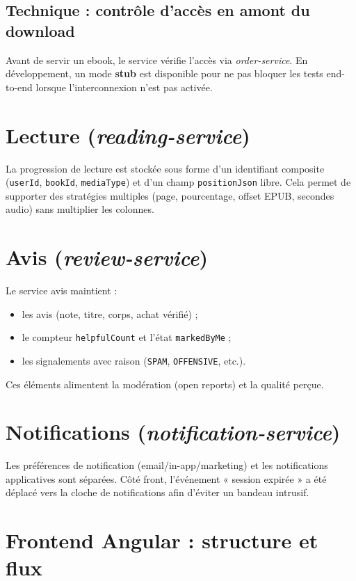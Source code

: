 \documentclass[12pt,a4paper]{report}
\begin{document}
\subsection{Technique : contrôle d'accès en amont du download}
Avant de servir un ebook, le service vérifie l'accès via \textit{order-service}. En développement, un mode \textbf{stub} est disponible pour ne pas bloquer les tests end-to-end lorsque l'interconnexion n'est pas activée.\par

\section{Lecture (\textit{reading-service})}
La progression de lecture est stockée sous forme d'un identifiant composite (\texttt{userId}, \texttt{bookId}, \texttt{mediaType}) et d'un champ \texttt{positionJson} libre. Cela permet de supporter des stratégies multiples (page, pourcentage, offset EPUB, secondes audio) sans multiplier les colonnes.\par

\section{Avis (\textit{review-service})}
Le service avis maintient :
\begin{itemize}
  \item les avis (note, titre, corps, achat vérifié) ;
  \item le compteur \texttt{helpfulCount} et l'état \texttt{markedByMe} ;
  \item les signalements avec raison (\texttt{SPAM}, \texttt{OFFENSIVE}, etc.).\par
\end{itemize}
Ces éléments alimentent la modération (open reports) et la qualité perçue.\par

\section{Notifications (\textit{notification-service})}
Les préférences de notification (email/in-app/marketing) et les notifications applicatives sont séparées. Côté front, l'événement « session expirée » a été déplacé vers la cloche de notifications afin d'éviter un bandeau intrusif.\par

\section{Frontend Angular : structure et flux}
\end{document}
